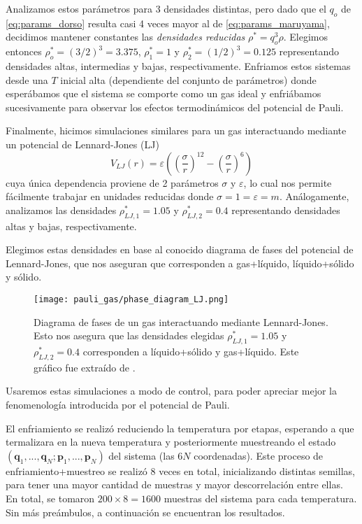 Analizamos estos parámetros para 3 densidades distintas, pero dado que el $q_o$ de \eqref{eq:params_dorso} resulta casi 4 veces mayor al de \eqref{eq:params_maruyama}, decidimos mantener
constantes las \textit{densidades reducidas} $\rho^* = q_o^3\rho$.
Elegimos entonces $\rho_o^* = (3/2)^3 = 3.375 $, $\rho_1^* = 1 $ y $\rho_2^* = (1/2)^3 = 0.125 $ representando densidades altas, intermedias y bajas, respectivamente.
Enfriamos estos sistemas desde una $T$ inicial alta (dependiente del conjunto de parámetros) donde esperábamos que el sistema se comporte como un gas ideal y enfriábamos sucesivamente 
para observar los efectos termodinámicos del potencial de Pauli.

Finalmente, hicimos simulaciones similares para un gas interactuando mediante un potencial de Lennard-Jones (LJ)
\[ V_{LJ}(r) = \varepsilon\left( \left( \frac{\sigma}{r} \right)^{12} - \left( \frac{\sigma}{r} \right)^6 \right) \]
cuya única dependencia proviene de 2 parámetros $\sigma$ y $\varepsilon$, lo cual nos permite fácilmente trabajar en unidades reducidas donde $\sigma=1=\varepsilon=m$.
Análogamente, analizamos las densidades $\rho_{LJ,1}^* = 1.05$ y $\rho_{LJ,2}^* = 0.4$ representando densidades altas y bajas, respectivamente.

Elegimos estas densidades en base al conocido diagrama de fases del potencial de Lennard-Jones, que nos aseguran que corresponden a gas+líquido, líquido+sólido y sólido.

\begin{figure}[h]
	\centering
	\texttt{[image: pauli\_gas/phase\_diagram\_LJ.png]}
	\caption{Diagrama de fases de un gas interactuando mediante Lennard-Jones.
	Esto nos asegura que las densidades elegidas $\rho_{LJ,1}^* = 1.05$ y $\rho_{LJ,2}^* = 0.4$ corresponden a líquido+sólido y gas+líquido.
	Este gráfico fue extraído de \cite{BOOK:HAILE}.}
	\label{fig:ej_diag_fases_LJ}
\end{figure}

Usaremos estas simulaciones a modo de control, para poder apreciar mejor la fenomenología introducida por el potencial de Pauli.

El enfriamiento se realizó reduciendo la temperatura por etapas, esperando a que termalizara en la nueva temperatura y posteriormente muestreando el estado
$(\mathbf{q}_1, ..., \mathbf{q}_N;\mathbf{p}_1, ..., \mathbf{p}_N)$ del sistema (las $6N$ coordenadas).
Este proceso de enfriamiento+muestreo se realizó 8 veces en total, inicializando distintas semillas, para tener una mayor cantidad de muestras y mayor descorrelación entre ellas.
En total, se tomaron $200\times 8 = 1600$ muestras del sistema para cada temperatura.
Sin más preámbulos, a continuación se encuentran los resultados.


